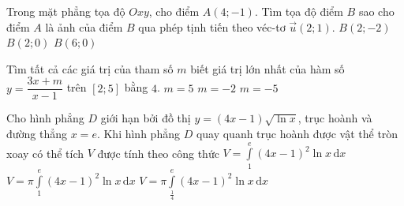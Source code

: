\begin{ex}%
Trong mặt phẳng tọa độ $Oxy$, cho điểm $A(4;-1)$. Tìm tọa độ điểm $B$ sao cho điểm $A$ là ảnh của điểm $B$ qua phép tịnh tiến theo véc-tơ $\overrightarrow{u}(2;1)$.
{\True $B(2;-2)$}
{$B(2;0)$}
{$B(6;0)$}
\end{ex}

\begin{ex}%
Tìm tất cả các giá trị của tham số $m$ biết giá trị lớn nhất của hàm số $y=\dfrac{3x+m}{x-1}$ trên $[2;5]$ bằng $4$.
{$m=5$}
{\True $m=-2$}
{$m=-5$}
\end{ex}

\begin{ex}%
Cho hình phẳng $D$ giới hạn bởi đồ thị $y=(4x-1)\sqrt{\ln x}$, trục hoành và đường thẳng $x=e$. Khi hình phẳng $D$ quay quanh trục hoành được vật thể tròn xoay có thể tích $V$ được tính theo công thức
{$V=\displaystyle\int\limits_{1}^e(4x-1)^2\ln x\mathrm{\, d}x$}
{\True $V=\pi\displaystyle\int\limits_{1}^e(4x-1)^2\ln x\mathrm{\, d}x$}
{$V=\pi\displaystyle\int\limits_{\tfrac{1}{4}}^e(4x-1)^2\ln x\mathrm{\, d}x$}
\end{ex}


